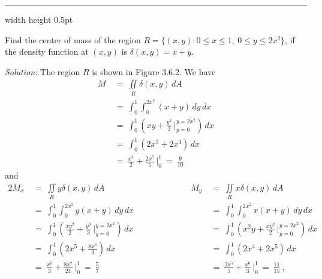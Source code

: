 \medskip
\hrule width \textwidth height 0.5pt
\begin{exmp}
 Find the center of mass of the region $R = \lbrace (x,y): 0 \le x \le 1,~ 0 \le y \le 2x^2 \rbrace$,
 if the density function at $(x,y)$ is $\delta(x,y) = x+y$.\smallskip
 \piccaption[]{}
 \par\noindent \emph{Solution:} The region $R$ is shown in Figure 3.6.2. We have
 \begin{align*}
  M ~&=~ \iint\limits_{R} \delta(x,y)\,dA\\
   &=~ \int_0^1 \int_0^{2x^2} (x+y)\,dy\,dx\\
   &=~ \int_0^1 \left( xy + \frac{y^2}{2} \,\Bigg|_{y=0}^{y=2x^2} \right) \,dx\\
   &=~ \int_0^1 ( 2x^3 + 2x^4 ) \,dx\\
   &=~ \frac{x^4}{2} + \frac{2x^5}{5} \,\Bigg|_0^1 ~=~ \frac{9}{10}
 \end{align*}
 and
 \begin{alignat*}{2}
  M_x ~&=~ \iint\limits_{R} y\delta(x,y)\,dA & M_y ~&=~ \iint\limits_{R} x\delta(x,y)\,dA\\
  &=~ \int_0^1 \int_0^{2x^2} y(x+y)\,dy\,dx \qquad\qquad\qquad & \phantom{M_y} &=~ \int_0^1 \int_0^{2x^2} x(x+y)\,dy\,dx\\
  &=~ \int_0^1 \left( \frac{xy^2}{2} + \frac{y^3}{3} \,\Bigg|_{y=0}^{y=2x^2} \right) \,dx & \phantom{M_y}
  &=~ \int_0^1 \left( x^2 y + \frac{xy^2}{2} \,\Bigg|_{y=0}^{y=2x^2} \right) \,dx\\
  &=~ \int_0^1 ( 2x^5 + \frac{8x^6}{3} ) \,dx & \phantom{M_y} &=~ \int_0^1 ( 2x^4 + 2x^5 ) \,dx\\
  &=~ \frac{x^6}{3} + \frac{8x^7}{21} \,\Bigg|_0^1 ~=~ \frac{5}{7} & \phantom{M_y}
  &=~ \frac{2x^5}{5} + \frac{x^6}{3} \,\Bigg|_0^1 ~=~ \frac{11}{15} ~,
 \end{alignat*}

\end{exmp}
